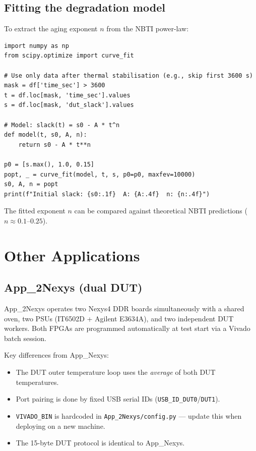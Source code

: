 \documentclass[12pt, a4paper]{report}
\begin{document}
\section{Fitting the degradation model}

To extract the aging exponent $n$ from the NBTI power-law:

\begin{lstlisting}[style=python, caption={Fitting slack vs. time to a power-law model}]
import numpy as np
from scipy.optimize import curve_fit

# Use only data after thermal stabilisation (e.g., skip first 3600 s)
mask = df['time_sec'] > 3600
t = df.loc[mask, 'time_sec'].values
s = df.loc[mask, 'dut_slack'].values

# Model: slack(t) = s0 - A * t^n
def model(t, s0, A, n):
    return s0 - A * t**n

p0 = [s.max(), 1.0, 0.15]
popt, _ = curve_fit(model, t, s, p0=p0, maxfev=10000)
s0, A, n = popt
print(f"Initial slack: {s0:.1f}  A: {A:.4f}  n: {n:.4f}")
\end{lstlisting}

The fitted exponent $n$ can be compared against theoretical NBTI predictions
($n \approx 0.1$--$0.25$).

\chapter{Other Applications}
\label{ch:otherapps}

\section{App\_2Nexys (dual DUT)}

App\_2Nexys operates two Nexys4 DDR boards simultaneously with a shared oven,
two PSUs (IT6502D + Agilent E3634A), and two independent DUT workers. Both
FPGAs are programmed automatically at test start via a Vivado batch session.

Key differences from App\_Nexys:
\begin{itemize}
  \item The DUT outer temperature loop uses the \emph{average} of both DUT temperatures.
  \item Port pairing is done by fixed USB serial IDs (\texttt{USB\_ID\_DUT0}/\texttt{DUT1}).
  \item \texttt{VIVADO\_BIN} is hardcoded in \texttt{App\_2Nexys/config.py} --- update
        this when deploying on a new machine.
  \item The 15-byte DUT protocol is identical to App\_Nexys.
\end{itemize}
\end{document}

